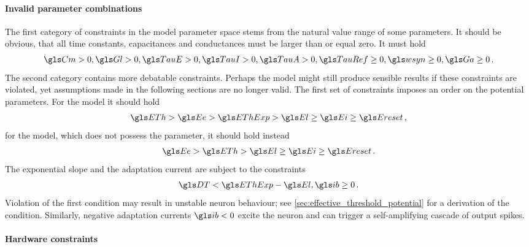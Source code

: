 \paragraph{Invalid parameter combinations}
The first category of constraints in the \AdEx model parameter space stems from the natural value range of some parameters. It should be obvious, that all time constants, capacitances and conductances must be larger than or equal zero. It must hold
\begin{align}
	\Cm > 0, \Gl > 0, \TauE > 0, \TauI > 0, \TauA > 0, \TauRef \geq 0, \wsyn \geq 0, \Ga \geq 0 \,.
\end{align}
The second category contains more debatable constraints. Perhaps the model might still produce sensible results if these constraints are violated, yet assumptions made in the following sections are no longer valid. The first set of constraints imposes an order on the potential parameters. For the \AdEx model it should hold
\begin{align}
	\ETh > \Ee > \EThExp > \El \geq \Ei \geq \Ereset \,,
\end{align}
for the \LIF model, which does not possess the \EThExp parameter, it should hold instead
\begin{align}
	\Ee > \ETh > \El \geq \Ei \geq \Ereset \,.
\end{align}
The exponential slope \DT and the adaptation current \ib are subject to the constraints
\begin{align}
	\DT < \EThExp - \El, \ib \geq 0 \,.
\end{align}
Violation of the first condition may result in unstable neuron behaviour; see \cref{sec:effective_threshold_potential} for a derivation of the condition. Similarly, negative adaptation currents $\ib < 0$ excite the neuron and can trigger a self-amplifying cascade of output spikes.


\paragraph{Hardware constraints}


